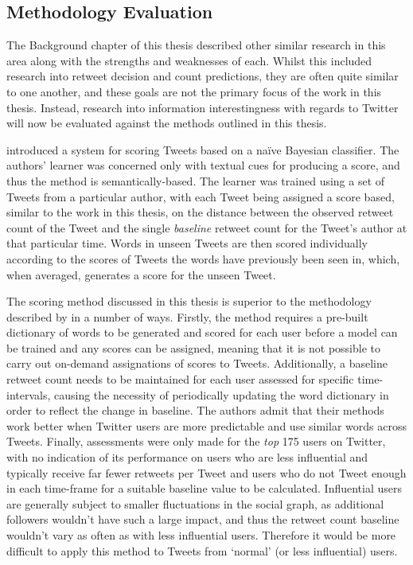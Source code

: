 \subsection{Methodology Evaluation}
The Background chapter of this thesis described other similar research in this area along with the strengths and weaknesses of each. Whilst this included research into retweet decision and count predictions, they are often quite similar to one another, and these goals are not the primary focus of the work in this thesis. Instead, research into information interestingness with regards to Twitter will now be evaluated against the methods outlined in this thesis.

\citet{gransee12} introduced a system for scoring Tweets based on a na{\"i}ve Bayesian classifier. The authors' learner was concerned only with textual cues for producing a score, and thus the method is semantically-based. The learner was trained using a set of Tweets from a particular author, with each Tweet being assigned a score based, similar to the work in this thesis, on the distance between the observed retweet count of the Tweet and the single \textit{baseline} retweet count for the Tweet's author at that particular time. Words in unseen Tweets are then scored individually according to the scores of Tweets the words have previously been seen in, which, when averaged, generates a score for the unseen Tweet.

The scoring method discussed in this thesis is superior to the methodology described by \citet{gransee12} in a number of ways. Firstly, the method requires a pre-built dictionary of words to be generated and scored for each user before a model can be trained and any scores can be assigned, meaning that it is not possible to carry out on-demand assignations of scores to Tweets. Additionally, a baseline retweet count needs to be maintained for each user assessed for specific time-intervals, causing the necessity of periodically updating the word dictionary in order to reflect the change in baseline. The authors admit that their methods work better when Twitter users are more predictable and use similar words across Tweets. Finally, assessments were only made for the \textit{top} 175 users on Twitter, with no indication of its performance on users who are less influential and typically receive far fewer retweets per Tweet and users who do not Tweet enough in each time-frame for a suitable baseline value to be calculated. Influential users are generally subject to smaller fluctuations in the social graph, as additional followers wouldn't have such a large impact, and thus the retweet count baseline wouldn't vary as often as with less influential users. Therefore it would be more difficult to apply this method to Tweets from `normal' (or less influential) users.

